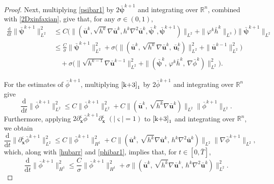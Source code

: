 \documentclass[11pt,reqno]{amsart}
\numberwithin{rk}{section}
\numberwithin{prop}{section}
\numberwithin{mydef}{section}
\numberwithin{lem}{section}
\numberwithin{equation}{section}
\numberwithin{thm}{section}
\begin{document}
\begin{proof}
Next, multiplying \eqref{psibar1} by $2\bar{\boldsymbol{\psi}}^{k+1}$ and integrating over $\mathbb{R}^n$, combined with \eqref{2Dxinfaxian}, give that, for any $\sigma\in (0,1)$,
\begin{equation}\label{psibar}
\begin{aligned}
\frac{\mathrm{d}}{\mathrm{d}t}\|\bar{\boldsymbol{\psi}}^{k+1}\|^2_{L^2}
&\leq C\big(\|(\bar{\boldsymbol{u}}^{k},\sqrt{h^k}\nabla \bar{\boldsymbol{u}}^{k},h^k\nabla^2\bar{\boldsymbol{u}}^k,\bar{\boldsymbol{\psi}}^k,\bar{\boldsymbol{\psi}}^{k+1})\|_{L^2}+\|\varphi^k\bar{h}^{k}\|_{L^3}\big)\|\bar{\boldsymbol{\psi}}^{k+1}\|_{L^2}\\
&\leq  \frac{C}{\sigma}\|\bar{\boldsymbol{\psi}}^{k+1}\|^2_{L^2}
+\sigma \big(\|(\bar{\boldsymbol{u}}^k,\,\sqrt{h^k}\nabla \bar{\boldsymbol{u}}^k,\,\bar{\boldsymbol{u}}^k_t)\|^2_{L^2}+\|\bar{\boldsymbol{u}}^{k-1}\|^2_{L^2}\big)\\
&\quad +\sigma\big(\|\sqrt{h^{k-1}}\nabla\bar{\boldsymbol{u}}^{k-1}\|^2_{L^2}
+\|(\bar{\boldsymbol{\psi}}^{k},\,\varphi^{k}\bar{h}^{k},\,\nabla \bar{\phi}^{k})\|^2_{L^2}\big).
\end{aligned}
\end{equation}
  

For the estimates of $\bar{\phi}^{k+1}$, multiplying $\eqref{k+3}_1$ by $2\bar{\phi}^{k+1}$ and integrating over $\mathbb{R}^n$ give 
\begin{equation}\label{phibar1}
\frac{\mathrm{d}}{\mathrm{d}t}\|\bar{\phi}^{k+1}\|^2_{L^2}\leq C\|\bar{\phi}^{k+1}\|^2_{L^2}
+C\|(\bar{\boldsymbol{u}}^{k},\,\sqrt{h^k}\nabla\bar{\boldsymbol{u}}^{k})\|_{L^2}\|\bar{\phi}^{k+1}\|_{L^2}.
\end{equation}
Furthermore, applying $2\partial^{\boldsymbol{\varsigma}}_{\boldsymbol{x}}\bar{\phi}^{k+1}\partial^{\boldsymbol{\varsigma}}_{\boldsymbol{x}}$ $(|\boldsymbol{\varsigma}|=1)$ to $\eqref{k+3}_1$  and  integrating over $\mathbb{R}^n$, we obtain 
\begin{equation*}
\frac{\mathrm{d}}{\mathrm{d}t}\|\partial^{\boldsymbol{\varsigma}}_{\boldsymbol{x}}\bar{\phi}^{k+1}\|^2_{L^2}\leq C\|\bar{\phi}^{k+1}\|^2_{H^1}+C\|(\bar{\boldsymbol{u}}^{k},\,\sqrt{h^k}\nabla\bar{\boldsymbol{u}}^{k},\,h^k\nabla^2\bar{\boldsymbol{u}}^{k})\|_{L^2}\|\nabla\bar{\phi}^{k+1}\|_{L^2},
\end{equation*}
which, along with \eqref{hubarr} and \eqref{phibar1}, implies that, for $t\in [0,\bar{T}]$,
\begin{equation}\label{phibar2}
\frac{\mathrm{d}}{\mathrm{d}t}\|\bar{\phi}^{k+1}\|^2_{H^1}\leq \frac{C}{\sigma}\|\bar{\phi}^{k+1}\|^2_{H^1
}+\sigma\|(\bar{\boldsymbol{u}}^{k},\,\sqrt{h^k}\nabla\bar{\boldsymbol{u}}^{k},\,h^k\nabla^2\bar{\boldsymbol{u}}^{k})\|^2_{L^2}.
\end{equation}






\end{proof}
\end{document}
